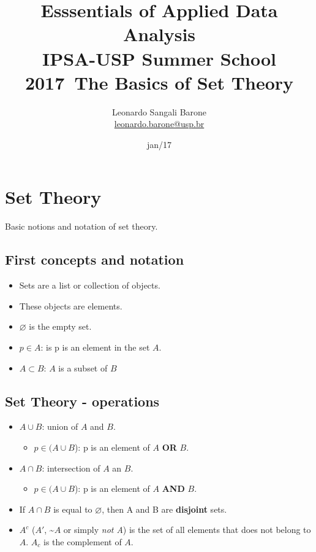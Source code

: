 \documentclass[11pt]{article}
\title{\textbf{Esssentials of Applied Data Analysis\\
				IPSA-USP Summer School 2017}\newline\
				The Basics of Set Theory}
\author{Leonardo Sangali Barone\\ \href{leonardo.barone@usp.br}{leonardo.barone@usp.br}}
\date{jan/17}
\let\emptyset\varnothing
\begin{document}
\maketitle

\section*{Set Theory}

Basic notions and notation of set theory.

\subsection*{First concepts and notation}

	\begin{itemize}
		\item Sets are a list or collection of objects.
		\item These objects are elements.
		\item $\emptyset$ is the empty set.
		\item $p \in A$: is p is an element in the set $A$.
		\item $A \subset B$: $A$ is a subset of $B$ 
	\end{itemize}


\subsection*{Set Theory - operations}

	\begin{itemize}
		\item $A \cup B$: union of $A$ and $B$.
		\begin{itemize}
			\item $p \in (A \cup B$): p is an element of $A$ \textbf{OR} $B$.
		\end{itemize}
		\item $A \cap B$: intersection of $A$ an $B$.
		\begin{itemize}
			\item $p \in (A \cup B$): p is an element of $A$ \textbf{AND} $B$.
		\end{itemize}
		\item If $A \cap B$ is equal to $\emptyset$, then A and B are \textbf{disjoint} sets.
		\item $A^c$ ($A'$, \textasciitilde$A$ or simply \emph{not A}) is the set of all elements that does not belong to $A$. $A_c$ is the complement of $A$. 

	\end{itemize}
\end{document}
